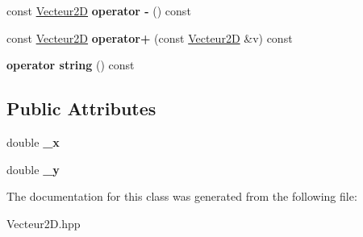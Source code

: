 \begin{DoxyCompactItemize}
const \mbox{\hyperlink{class_vecteur2_d}{Vecteur2D}} {\bfseries operator -\/} () const
\item 
\mbox{\label{class_vecteur2_d_a49a411eda0b0c5664d8b505b302628c6}} 
const \mbox{\hyperlink{class_vecteur2_d}{Vecteur2D}} {\bfseries operator+} (const \mbox{\hyperlink{class_vecteur2_d}{Vecteur2D}} \&v) const
\item 
\mbox{\label{class_vecteur2_d_a10c83f5b0aaa60cc01912b33e3c76fc5}} 
{\bfseries operator string} () const
\end{DoxyCompactItemize}
\subsection*{Public Attributes}
\begin{DoxyCompactItemize}
\item 
\mbox{\label{class_vecteur2_d_a7198a1a8d14f452a0e7052a679f147e7}} 
double {\bfseries \+\_\+x}
\item 
\mbox{\label{class_vecteur2_d_a797c4e61d7c0693842ec7effea315ce2}} 
double {\bfseries \+\_\+y}
\end{DoxyCompactItemize}


The documentation for this class was generated from the following file\+:\begin{DoxyCompactItemize}
\item 
Vecteur2\+D.\+hpp\end{DoxyCompactItemize}
